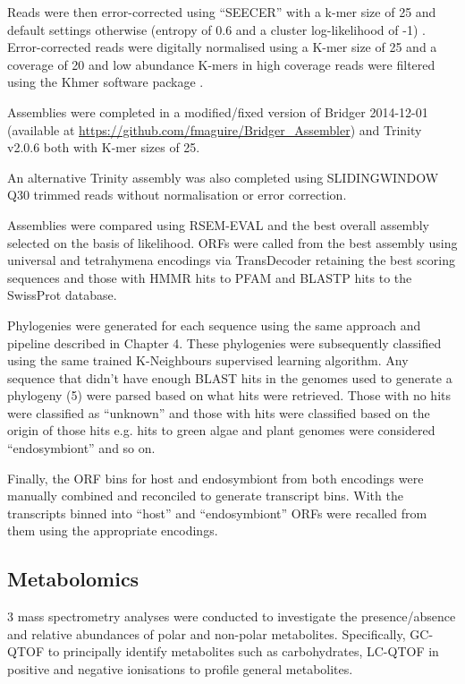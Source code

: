 Reads were then error-corrected using ``SEECER'' with a k-mer size of 25 and 
default settings otherwise (entropy of 0.6 and a cluster log-likelihood
of -1) \citep{Le2013}.  Error-corrected reads were digitally normalised
using a K-mer size of 25 and a coverage of 20 \citep{Brown2012} and 
low abundance K-mers in high coverage reads were filtered \citep{Zhang2014,Zhang2015}
using the Khmer software package \citep{Doring2008,Crusoe2015}.

Assemblies were completed in a modified/fixed version of 
Bridger 2014-12-01 \citep{Chang2015} (available at
\url{https://github.com/fmaguire/Bridger_Assembler}) and 
Trinity v2.0.6 \citep{Grabherr2011,Haas2013} both with K-mer
sizes of 25.

An alternative Trinity assembly was also completed using
SLIDINGWINDOW Q30 trimmed reads without normalisation or 
error correction.

Assemblies were compared using RSEM-EVAL \citep{Li2014} and the best
overall assembly selected on the basis of likelihood.
ORFs were called from the best assembly using universal and tetrahymena encodings 
via TransDecoder \citep{Haas2013} retaining the best scoring sequences and those
with HMMR hits to PFAM and BLASTP hits to the SwissProt database. 

Phylogenies were generated for each sequence using the same approach and pipeline
described in Chapter 4. These phylogenies were subsequently classified using the 
same trained K-Neighbours supervised learning algorithm.
Any sequence that didn't have enough BLAST hits in the genomes used to generate
a phylogeny (5) were parsed based on what hits were retrieved.
Those with no hits were classified as ``unknown'' and those with
hits were classified based on the origin of those hits e.g. hits
to green algae and plant genomes were considered ``endosymbiont'' and so on.

Finally, the ORF bins for host and endosymbiont 
from both encodings were manually combined and reconciled
to generate transcript bins.  With the transcripts binned into
``host'' and ``endosymbiont'' ORFs were recalled from them using the appropriate
encodings. 

\subsection{Metabolomics}

3 mass spectrometry analyses were conducted to investigate the presence/absence
and relative abundances of polar and non-polar metabolites.
Specifically, GC-QTOF to principally identify metabolites such as carbohydrates,
LC-QTOF in positive and negative ionisations to profile general metabolites.

